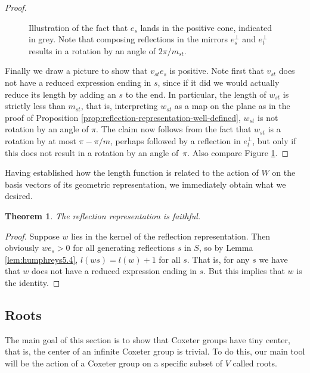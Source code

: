 \documentclass{article}
\newtheorem{theorem}{Theorem}[section]
\theoremstyle{definition}
\begin{document}
\begin{proof}
\begin{figure}[ht]
\begin{minipage}{.5\textwidth}
\end{minipage}
\caption{Illustration of the fact that $e_s$ lands in the positive cone, indicated in grey. Note that composing reflections in the mirrors $e_s^\perp$ and $e_t^\perp$ results in a rotation by an angle of $2\pi/m_{st}$.}
\label{fig:humphreys-5.4-proof}
\end{figure}

Finally we draw a picture to show that $v_{st}e_s$ is positive. Note first that $v_{st}$ does not have a reduced expression ending in $s$, since if it did we would actually reduce its length by adding an $s$ to the end. In particular, the length of $w_{st}$ is strictly less than $m_{st}$, that is, interpreting $w_{st}$ as a map on the plane as in the proof of Proposition \ref{prop:reflection-representation-well-defined}, $w_{st}$ is not rotation by an angle of $\pi$. The claim now follows from the fact that $w_{st}$ is a rotation by at most $\pi - \pi/m$, perhaps followed by a reflection in $e_t^\perp$, but only if this does not result in a rotation by an angle of~$\pi$. Also compare Figure \ref{fig:humphreys-5.4-proof}.
\end{proof}

Having established how the length function is related to the action of $W$ on the basis vectors of its geometric representation, we immediately obtain what we desired.

\begin{theorem}
The reflection representation is faithful.
\end{theorem}

\begin{proof}
Suppose $w$ lies in the kernel of the reflection representation. Then obviously $we_s > 0$ for all generating reflections $s$ in $S$, so by Lemma \ref{lem:humphreys5.4}, $l(ws) = l(w) + 1$ for all $s$. That is, for any $s$ we have that $w$ does not have a reduced expression ending in $s$. But this implies that $w$ is the identity.
\end{proof}

\subsection{Roots}\label{subsec:roots}
The main goal of this section is to show that Coxeter groups have tiny center, that is, the center of an infinite Coxeter group is trivial. To do this, our main tool will be the action of a Coxeter group on a specific subset of $V$ called roots.
\end{document}
